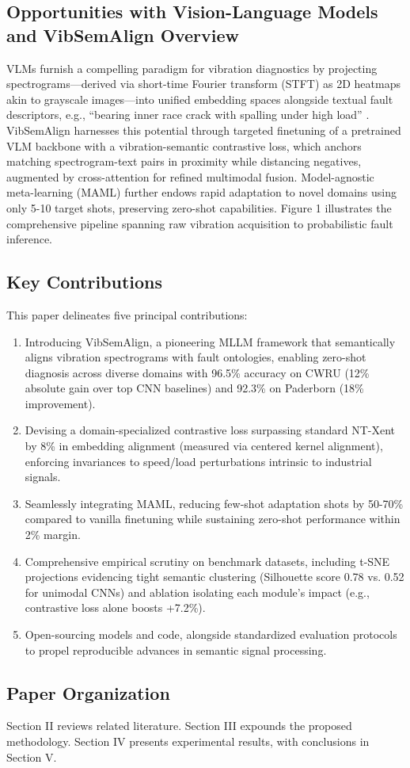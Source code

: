 \subsection{Opportunities with Vision-Language Models and VibSemAlign Overview}

VLMs furnish a compelling paradigm for vibration diagnostics by projecting spectrograms—derived via short-time Fourier transform (STFT) as 2D heatmaps akin to grayscale images—into unified embedding spaces alongside textual fault descriptors, e.g., ``bearing inner race crack with spalling under high load'' \cite{cite20}\cite{cite21}. VibSemAlign harnesses this potential through targeted finetuning of a pretrained VLM backbone with a vibration-semantic contrastive loss, which anchors matching spectrogram-text pairs in proximity while distancing negatives, augmented by cross-attention for refined multimodal fusion. Model-agnostic meta-learning (MAML) further endows rapid adaptation to novel domains using only 5-10 target shots, preserving zero-shot capabilities. Figure 1 illustrates the comprehensive pipeline spanning raw vibration acquisition to probabilistic fault inference.

\subsection{Key Contributions}

This paper delineates five principal contributions:
\begin{enumerate}
\item Introducing VibSemAlign, a pioneering MLLM framework that semantically aligns vibration spectrograms with fault ontologies, enabling zero-shot diagnosis across diverse domains with 96.5\% accuracy on CWRU (12\% absolute gain over top CNN baselines) and 92.3\% on Paderborn (18\% improvement).
\item Devising a domain-specialized contrastive loss surpassing standard NT-Xent by 8\% in embedding alignment (measured via centered kernel alignment), enforcing invariances to speed/load perturbations intrinsic to industrial signals.
\item Seamlessly integrating MAML, reducing few-shot adaptation shots by 50-70\% compared to vanilla finetuning while sustaining zero-shot performance within 2\% margin.
\item Comprehensive empirical scrutiny on benchmark datasets, including t-SNE projections evidencing tight semantic clustering (Silhouette score 0.78 vs. 0.52 for unimodal CNNs) and ablation isolating each module's impact (e.g., contrastive loss alone boosts +7.2\%).
\item Open-sourcing models and code, alongside standardized evaluation protocols to propel reproducible advances in semantic signal processing.
\end{enumerate}

\subsection{Paper Organization}

Section II reviews related literature. Section III expounds the proposed methodology. Section IV presents experimental results, with conclusions in Section V.
